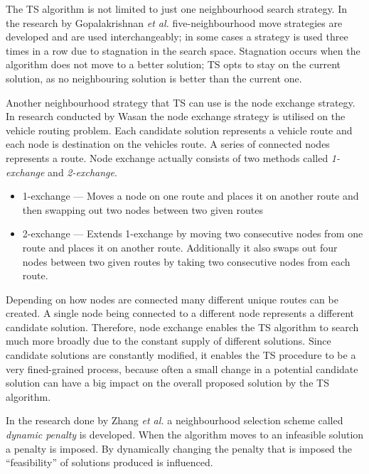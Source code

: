 The \gls{TS} algorithm is not limited to just one neighbourhood search strategy. In the research by Gopalakrishnan \emph{et al.}\cite{TabuCarryOver} five-neighbourhood move strategies are developed and are used interchangeably; in some cases a strategy is used three times in a row due to stagnation in the search space. Stagnation occurs when the algorithm does not move to a better solution; \gls{TS} opts to stay on the current solution, as no neighbouring solution is better than the current one. 

Another neighbourhood strategy that \gls{TS} can use is the node exchange strategy. In research conducted by Wasan the node exchange strategy is utilised on the vehicle routing problem. Each candidate solution represents a vehicle route and each node is destination on the vehicles route. A series of connected nodes represents a route. Node exchange actually consists of two methods called \emph{1-exchange} and \emph{2-exchange}\cite{ReactiveTabuVHR}.
\begin{itemize}
\item{1-exchange} --- Moves a node on one route and places it on another route and then swapping out two nodes between two given routes\cite{ReactiveTabuVHR}
\item{2-exchange} --- Extends 1-exchange by moving two consecutive nodes from one route and places it on another route. Additionally it also swaps out four nodes between two given routes by taking two consecutive nodes from each route\cite{ReactiveTabuVHR}.
\end{itemize}

Depending on how nodes are connected many different unique routes can be created. A single node being connected to a different node represents a different candidate solution. Therefore, node exchange enables the \gls{TS} algorithm to search much more broadly due to the constant supply of different solutions. Since candidate solutions are constantly modified, it enables the \gls{TS} procedure to be a very fined-grained process, because often a small change in a potential candidate solution can have a big impact on the overall proposed solution by the \gls{TS} algorithm.

In the research done by Zhang \emph{et al.}\cite{TSHazardous} a neighbourhood selection scheme called \emph{dynamic penalty} is developed. When the algorithm moves to an infeasible solution a penalty is imposed. By dynamically changing the penalty that is imposed the ``feasibility'' of solutions produced is influenced. 

